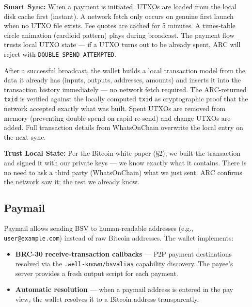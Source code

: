 \documentclass[a4paper, 11pt, openany]{book}
\begin{document}
\begin{notebox}
\textbf{Smart Sync:} When a payment is initiated, UTXOs are loaded from the local disk cache first (instant). A network fetch only occurs on genuine first launch when no UTXO file exists. Fee quotes are cached for 5 minutes. A times-table circle animation (cardioid pattern) plays during broadcast. The payment flow trusts local UTXO state --- if a UTXO turns out to be already spent, ARC will reject with \texttt{DOUBLE\_SPEND\_ATTEMPTED}.
\end{notebox}

After a successful broadcast, the wallet builds a local transaction model from the data it already has (inputs, outputs, addresses, amounts) and inserts it into the transaction history immediately --- no network fetch required. The ARC-returned \texttt{txid} is verified against the locally computed \texttt{txid} as cryptographic proof that the network accepted exactly what was built. Spent UTXOs are removed from memory (preventing double-spend on rapid re-send) and change UTXOs are added. Full transaction details from WhatsOnChain overwrite the local entry on the next sync.

\begin{notebox}
\textbf{Trust Local State:} Per the Bitcoin white paper (\S2), we built the transaction and signed it with our private keys --- we know exactly what it contains. There is no need to ask a third party (WhatsOnChain) what we just sent. ARC confirms the network saw it; the rest we already know.
\end{notebox}

\subsection{Paymail}

Paymail allows sending BSV to human-readable addresses (e.g., \texttt{user@example.com}) instead of raw Bitcoin addresses. The wallet implements:

\begin{itemize}
\item \textbf{BRC-30 receive-transaction callbacks} --- P2P payment destinations resolved via the \texttt{.well-known/bsvalias} capability discovery. The payee's server provides a fresh output script for each payment.
\item \textbf{Automatic resolution} --- when a paymail address is entered in the pay view, the wallet resolves it to a Bitcoin address transparently.
\end{itemize}
\end{document}
